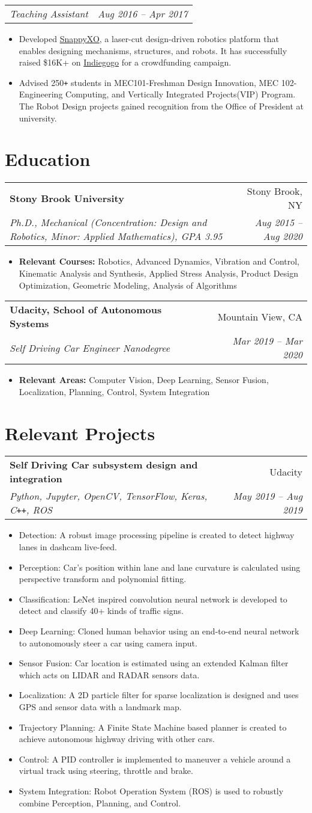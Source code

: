 \documentclass[letterpaper,10pt]{article}
\makeatletter
\newcommand{\resumeHeading}[4]{
  \vspace{-1pt}
    \begin{tabular*}{0.97\textwidth}{l@{\extracolsep{\fill}}r}
      \textbf{#1} & #2 \vspace{-2pt}\\ \vspace{1pt}
      \textit{\small#3} & \textit{\small #4} \\
    \end{tabular*}
}
\newcommand{\resumeSubheadingWithDate}[2]{
    \begin{tabular*}{0.97\textwidth}{l@{\extracolsep{\fill}}r}
      \textit{\small#1} & \textit{\small #2}\\
    \end{tabular*}
    \vspace{+2pt}
}
\newcommand{\resumeSection}[1]{
\vspace{-12pt}
\section{\textbf{#1}}
}
\newcommand{\resumeItemListStart}{
\vspace{-7pt}
\begin{itemize}[leftmargin=14pt]
}
\newcommand{\resumeItemListEnd}{
\vspace{+7pt}
\end{itemize}
}
\newcommand{\resumeItem}[1]{
  \item\small{
      {#1 \vspace{-7pt}
      }
  }
}
\makeatother
\begin{document}
\vspace{-5pt}
\resumeSubheadingWithDate{Teaching Assistant}{Aug 2016 -- Apr 2017}
\resumeItemListStart
\resumeItem{Developed \href{http://snappyxo.com/}{SnappyXO}, a laser-cut design-driven robotics platform that enables designing mechanisms, structures, and robots. It has successfully raised \$16K+ on \href{https://www.indiegogo.com/projects/snappyxo-a-design-driven-robotics-education-kit}{Indiegogo} for a crowdfunding campaign.}
\resumeItem{Advised 250\texttt{+} students in MEC101-Freshman Design Innovation, MEC 102-Engineering Computing, and Vertically Integrated Projects(VIP) Program. The Robot Design projects gained recognition from the Office of President at university.}
\resumeItemListEnd
	


\resumeSection{Education}
\resumeHeading
{Stony Brook University}{Stony Brook, NY}
{Ph.D., Mechanical (Concentration: Design and Robotics, Minor: Applied Mathematics), GPA 3.95}{Aug 2015 -- Aug 2020}
\resumeItemListStart
\resumeItem{\textbf{Relevant Courses:} Robotics, Advanced Dynamics, Vibration and Control, Kinematic Analysis and Synthesis,  Applied Stress Analysis, Product Design Optimization, Geometric Modeling, Analysis of Algorithms}
\resumeItemListEnd

\resumeHeading{Udacity, School of Autonomous Systems}{Mountain View, CA}{Self Driving Car Engineer Nanodegree}{Mar 2019 -- Mar 2020}
\resumeItemListStart
\resumeItem{\textbf{Relevant Areas:} Computer Vision, Deep Learning, Sensor Fusion, Localization, Planning, Control, System Integration}
\resumeItemListEnd



\resumeSection{Relevant Projects}
    
    \resumeHeading{Self Driving Car subsystem design and integration}{Udacity}{Python, Jupyter, OpenCV, TensorFlow, Keras, C\texttt{++}, ROS}{May 2019 -- Aug 2019}
    \resumeItemListStart
    \resumeItem{Detection: A robust image processing pipeline is created to detect highway lanes in dashcam live-feed.}
    \resumeItem{Perception: Car's position within lane and lane curvature is calculated using perspective transform and polynomial fitting.}
    \resumeItem{Classification: LeNet inspired convolution neural network is developed to detect and classify 40+ kinds of traffic signs.}
    \resumeItem{Deep Learning: Cloned human behavior using an end-to-end neural network to autonomously steer a car using camera input.}
    \resumeItem{Sensor Fusion: Car location is estimated using an extended Kalman filter which acts on LIDAR and RADAR sensors data.}
    \resumeItem{Localization: A 2D particle filter for sparse localization is designed and uses GPS and sensor data with a landmark map.}
    \resumeItem{Trajectory Planning: A Finite State Machine based planner is created to achieve autonomous highway driving with other cars.}
    \resumeItem{Control: A PID controller is implemented to maneuver a vehicle around a virtual track using steering, throttle and brake.}
    \resumeItem{System Integration: Robot Operation System (ROS) is used to robustly combine Perception, Planning, and Control.}
    \resumeItemListEnd
\end{document}
